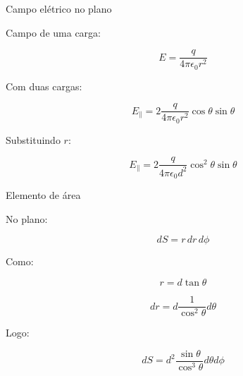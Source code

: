 \documentclass[aspectratio=169,11pt]{beamer}
\begin{document}
\begin{frame}{Campo elétrico no plano}

Campo de uma carga:

\begin{eqbox}
\begin{equation}
E = \frac{q}{4\pi\epsilon_0 r^2}
\end{equation}
\end{eqbox}

Com duas cargas:

\begin{eqbox}
\begin{equation}
E_{\parallel} = 2 \frac{q}{4\pi\epsilon_0 r^2}\cos\theta \sin\theta
\end{equation}
\end{eqbox}

Substituindo $r$:

\begin{eqbox}
\begin{equation}
E_{\parallel}
= 2 \frac{q}{4\pi\epsilon_0 d^2}
\cos^2\theta \sin\theta
\end{equation}
\end{eqbox}

\end{frame}

\begin{frame}{Elemento de área}

No plano:

\begin{eqbox}
\begin{equation}
dS = r\,dr\,d\phi
\end{equation}
\end{eqbox}

Como:

\[
r = d \tan\theta
\]

\[
dr = d \frac{1}{\cos^2\theta} d\theta
\]

Logo:

\begin{eqbox}
\begin{equation}
dS = d^2 \frac{\sin\theta}{\cos^3\theta} d\theta d\phi
\end{equation}
\end{eqbox}

\end{frame}
\end{document}
